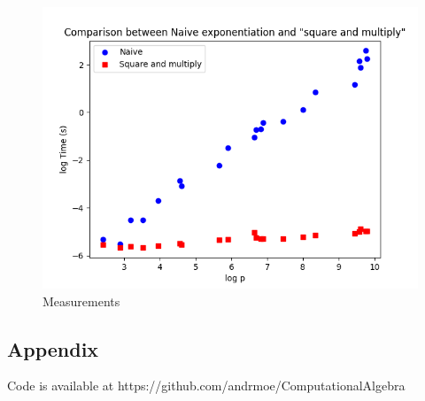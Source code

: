 \documentclass[12pt,a4paper]{article}
\begin{document}
\begin{figure}[htbp]
    \centering
    \includegraphics[width=\linewidth]{plot_2025-01-24 14-39-00_0.png}
    \caption{Measurements}
    \label{figure1}
\end{figure}
\newpage
\begin{appendix}
\section*{Appendix}
    Code is available at https://github.com/andrmoe/ComputationalAlgebra
    
    
    
\end{appendix}
\end{document}
